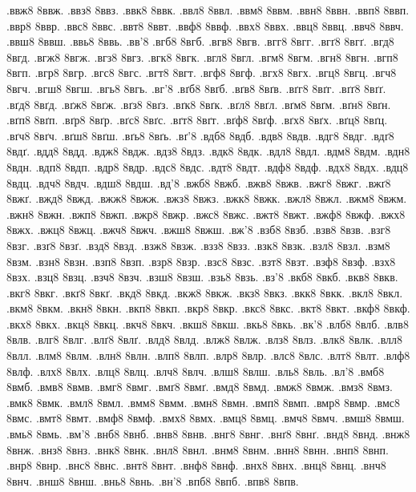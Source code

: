 {.ввж8
8ввж.
.ввз8
8ввз.
.ввк8
8ввк.
.ввл8
8ввл.
.ввм8
8ввм.
.ввн8
8ввн.
.ввп8
8ввп.
.ввр8
8ввр.
.ввс8
8ввс.
.ввт8
8ввт.
.ввф8
8ввф.
.ввх8
8ввх.
.ввц8
8ввц.
.ввч8
8ввч.
.ввш8
8ввш.
.ввь8
8ввь.
.вв'8
.вгб8
8вгб.
.вгв8
8вгв.
.вгг8
8вгг.
.вгґ8
8вгґ.
.вгд8
8вгд.
.вгж8
8вгж.
.вгз8
8вгз.
.вгк8
8вгк.
.вгл8
8вгл.
.вгм8
8вгм.
.вгн8
8вгн.
.вгп8
8вгп.
.вгр8
8вгр.
.вгс8
8вгс.
.вгт8
8вгт.
.вгф8
8вгф.
.вгх8
8вгх.
.вгц8
8вгц.
.вгч8
8вгч.
.вгш8
8вгш.
.вгь8
8вгь.
.вг'8
.вґб8
8вґб.
.вґв8
8вґв.
.вґг8
8вґг.
.вґґ8
8вґґ.
.вґд8
8вґд.
.вґж8
8вґж.
.вґз8
8вґз.
.вґк8
8вґк.
.вґл8
8вґл.
.вґм8
8вґм.
.вґн8
8вґн.
.вґп8
8вґп.
.вґр8
8вґр.
.вґс8
8вґс.
.вґт8
8вґт.
.вґф8
8вґф.
.вґх8
8вґх.
.вґц8
8вґц.
.вґч8
8вґч.
.вґш8
8вґш.
.вґь8
8вґь.
.вґ'8
.вдб8
8вдб.
.вдв8
8вдв.
.вдг8
8вдг.
.вдґ8
8вдґ.
.вдд8
8вдд.
.вдж8
8вдж.
.вдз8
8вдз.
.вдк8
8вдк.
.вдл8
8вдл.
.вдм8
8вдм.
.вдн8
8вдн.
.вдп8
8вдп.
.вдр8
8вдр.
.вдс8
8вдс.
.вдт8
8вдт.
.вдф8
8вдф.
.вдх8
8вдх.
.вдц8
8вдц.
.вдч8
8вдч.
.вдш8
8вдш.
.вд'8
.вжб8
8вжб.
.вжв8
8вжв.
.вжг8
8вжг.
.вжґ8
8вжґ.
.вжд8
8вжд.
.вжж8
8вжж.
.вжз8
8вжз.
.вжк8
8вжк.
.вжл8
8вжл.
.вжм8
8вжм.
.вжн8
8вжн.
.вжп8
8вжп.
.вжр8
8вжр.
.вжс8
8вжс.
.вжт8
8вжт.
.вжф8
8вжф.
.вжх8
8вжх.
.вжц8
8вжц.
.вжч8
8вжч.
.вжш8
8вжш.
.вж'8
.взб8
8взб.
.взв8
8взв.
.взг8
8взг.
.взґ8
8взґ.
.взд8
8взд.
.взж8
8взж.
.взз8
8взз.
.взк8
8взк.
.взл8
8взл.
.взм8
8взм.
.взн8
8взн.
.взп8
8взп.
.взр8
8взр.
.взс8
8взс.
.взт8
8взт.
.взф8
8взф.
.взх8
8взх.
.взц8
8взц.
.взч8
8взч.
.взш8
8взш.
.взь8
8взь.
.вз'8
.вкб8
8вкб.
.вкв8
8вкв.
.вкг8
8вкг.
.вкґ8
8вкґ.
.вкд8
8вкд.
.вкж8
8вкж.
.вкз8
8вкз.
.вкк8
8вкк.
.вкл8
8вкл.
.вкм8
8вкм.
.вкн8
8вкн.
.вкп8
8вкп.
.вкр8
8вкр.
.вкс8
8вкс.
.вкт8
8вкт.
.вкф8
8вкф.
.вкх8
8вкх.
.вкц8
8вкц.
.вкч8
8вкч.
.вкш8
8вкш.
.вкь8
8вкь.
.вк'8
.влб8
8влб.
.влв8
8влв.
.влг8
8влг.
.влґ8
8влґ.
.влд8
8влд.
.влж8
8влж.
.влз8
8влз.
.влк8
8влк.
.влл8
8влл.
.влм8
8влм.
.влн8
8влн.
.влп8
8влп.
.влр8
8влр.
.влс8
8влс.
.влт8
8влт.
.влф8
8влф.
.влх8
8влх.
.влц8
8влц.
.влч8
8влч.
.влш8
8влш.
.вль8
8вль.
.вл'8
.вмб8
8вмб.
.вмв8
8вмв.
.вмг8
8вмг.
.вмґ8
8вмґ.
.вмд8
8вмд.
.вмж8
8вмж.
.вмз8
8вмз.
.вмк8
8вмк.
.вмл8
8вмл.
.вмм8
8вмм.
.вмн8
8вмн.
.вмп8
8вмп.
.вмр8
8вмр.
.вмс8
8вмс.
.вмт8
8вмт.
.вмф8
8вмф.
.вмх8
8вмх.
.вмц8
8вмц.
.вмч8
8вмч.
.вмш8
8вмш.
.вмь8
8вмь.
.вм'8
.внб8
8внб.
.внв8
8внв.
.внг8
8внг.
.внґ8
8внґ.
.внд8
8внд.
.внж8
8внж.
.внз8
8внз.
.внк8
8внк.
.внл8
8внл.
.внм8
8внм.
.внн8
8внн.
.внп8
8внп.
.внр8
8внр.
.внс8
8внс.
.внт8
8внт.
.внф8
8внф.
.внх8
8внх.
.внц8
8внц.
.внч8
8внч.
.внш8
8внш.
.внь8
8внь.
.вн'8
.впб8
8впб.
.впв8
8впв.
}
